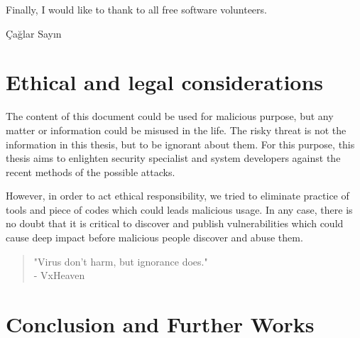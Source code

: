 \documentclass[medieteknikk]{gucmasterthesis}
\begin{document}
Finally, I would like to thank to all free software volunteers. 

\vspace{\baselineskip}
\noindent Çağlar Sayın \gucmasterthesisdate

\chapter*{Ethical and legal considerations}

The content of this document could be used for malicious purpose, but any matter or information could be misused in the life. The risky threat is not the information in this thesis, but to be ignorant about them. For this purpose, this thesis aims to enlighten security specialist and system developers against the recent methods of the possible attacks. 

However, in order to act ethical responsibility, we tried to eliminate practice of tools and piece of codes which could leads malicious usage. In any case, there is no doubt that it is critical to discover and publish vulnerabilities which could cause deep impact before malicious people discover and abuse them.

\begin{quote}

	"Virus don't harm, but ignorance does."\\
	- VxHeaven
\end{quote}

\tableofcontents
\listoffigures
\listoftables






\chapter{Conclusion and Further Works}


\appendix


\end{document}
